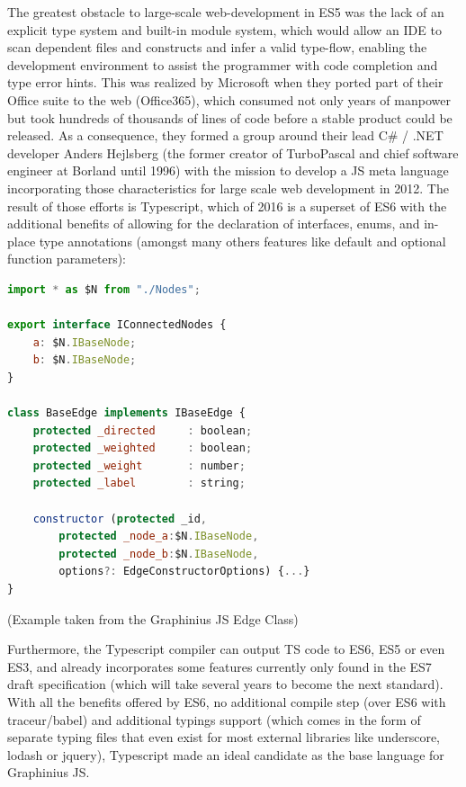 	The greatest obstacle to large-scale web-development in ES5 was the lack of an explicit type system and built-in module system, which would allow an IDE to scan dependent files and constructs and infer a valid type-flow, enabling the development environment to assist the programmer with code completion and type error hints. This was realized by Microsoft when they ported part of their Office suite to the web (Office365), which consumed not only years of manpower but took hundreds of thousands of lines of code before a stable product could be released. As a consequence, they formed a group around their lead C\# / .NET developer Anders Hejlsberg (the former creator of TurboPascal and chief software engineer at Borland until 1996) with the mission to develop a JS meta language incorporating those characteristics for large scale web development in 2012. The result of those efforts is Typescript, which of 2016 is a superset of ES6 with the additional benefits of allowing for the declaration of interfaces, enums, and in-place type annotations (amongst many others features like default and optional function parameters): 
	
	\begin{lstlisting}[caption={Typescript sample featuring import of an external module, an exported interface definition, type annotations, instance variable setting via constructor specifiers (protected) as well as optional parameters}, label={fig:TS example}, language=JavaScript]
import * as $N from "./Nodes";

export interface IConnectedNodes {
	a: $N.IBaseNode;
	b: $N.IBaseNode;
}

class BaseEdge implements IBaseEdge {
	protected _directed		: boolean;
	protected _weighted 	: boolean;
	protected _weight		: number;
	protected _label		: string;
	
	constructor (protected _id,
		protected _node_a:$N.IBaseNode,
		protected _node_b:$N.IBaseNode,
		options?: EdgeConstructorOptions) {...}
}	
	\end{lstlisting}
	\vspace{-0.3cm}
	\begin{center}
		\small
		(Example taken from the Graphinius JS Edge Class)
	\end{center}
	
	Furthermore, the Typescript compiler can output TS code to ES6, ES5 or even ES3, and already incorporates some features currently only found in the ES7 draft specification (which will take several years to become the next standard). With all the benefits offered by ES6, no additional compile step (over ES6 with traceur/babel) and additional typings support (which comes in the form of separate typing files that even exist for most external libraries like underscore, lodash or jquery), Typescript made an ideal candidate as the base language for Graphinius JS.
	

